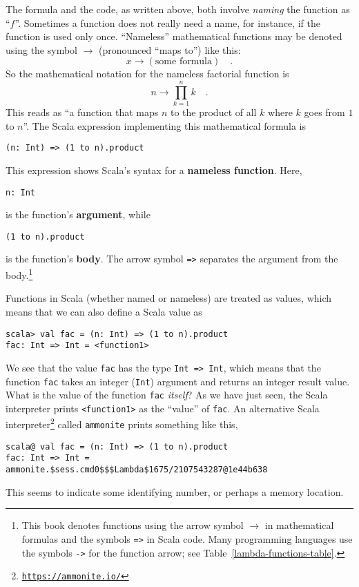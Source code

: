 The formula and the code, as written above, both involve \emph{naming}
the function as \textsf{``}$f$\textsf{''}. Sometimes a function does not really need
a name, \textemdash{} for instance, if the function is used only once.
\textsf{``}Nameless\textsf{''} mathematical functions may be denoted using the symbol
$\rightarrow$ (pronounced \textsf{``}maps to\textsf{''}) like this: 
\[
x\rightarrow\left(\text{some formula}\right)\quad.
\]
So the mathematical notation for the nameless factorial function is
\[
n\rightarrow\prod_{k=1}^{n}k\quad.
\]
This reads as \textsf{``}a function that maps $n$ to the product of all $k$
where $k$ goes from $1$ to $n$\textsf{''}. The Scala expression implementing
this mathematical formula is
\begin{lstlisting}
(n: Int) => (1 to n).product
\end{lstlisting}
This expression shows Scala\textsf{'}s syntax for a \textbf{nameless function}.
Here, 
\begin{lstlisting}
n: Int
\end{lstlisting}
is the function\textsf{'}s \textbf{argument}, while
\begin{lstlisting}
(1 to n).product
\end{lstlisting}
is the function\textsf{'}s \textbf{body}. The arrow symbol \lstinline!=>!
separates the argument from the body.\footnote{This book denotes functions using the arrow symbol $\rightarrow$
in mathematical formulas and the symbols \lstinline!=>! in Scala
code. Many programming languages use the symbols \lstinline!->! for
the function arrow; see Table~\ref{lambda-functions-table}.} 

Functions in Scala (whether named or nameless) are treated as values,
which means that we can also define a Scala value as
\begin{lstlisting}
scala> val fac = (n: Int) => (1 to n).product
fac: Int => Int = <function1>
\end{lstlisting}
We see that the value \lstinline!fac! has the type \lstinline!Int => Int!,
which means that the function \lstinline!fac! takes an integer (\lstinline!Int!)
argument and returns an integer result value. What is the value of
the function \lstinline!fac! \emph{itself}? As we have just seen,
the Scala interpreter prints \lstinline!<function1>! as the \textsf{``}value\textsf{''}
of \lstinline!fac!. An alternative Scala interpreter\footnote{\texttt{\href{https://ammonite.io/}{https://ammonite.io/}}}
called \texttt{ammonite} prints something like this,
\begin{lstlisting}
scala@ val fac = (n: Int) => (1 to n).product
fac: Int => Int = ammonite.$sess.cmd0$$$Lambda$1675/2107543287@1e44b638
\end{lstlisting}
This seems to indicate some identifying number, or perhaps a memory
location.

